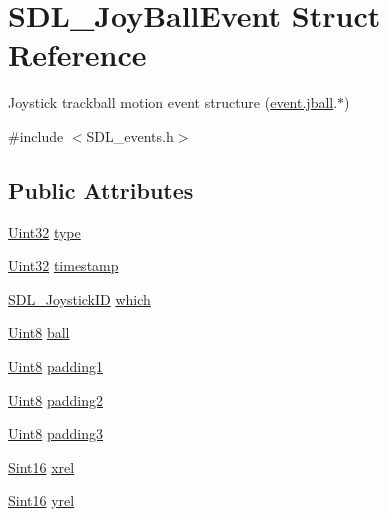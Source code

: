 \hypertarget{struct_s_d_l___joy_ball_event}{\section{S\-D\-L\-\_\-\-Joy\-Ball\-Event Struct Reference}
\label{struct_s_d_l___joy_ball_event}
}


Joystick trackball motion event structure (\hyperlink{union_s_d_l___event_ae433f511e3383d17f8fe02df745ee8f8}{event.\-jball}.$\ast$)  




{\ttfamily \#include $<$S\-D\-L\-\_\-events.\-h$>$}

\subsection*{Public Attributes}
\begin{DoxyCompactItemize}
\item 
\hyperlink{_s_d_l__stdinc_8h_add440eff171ea5f55cb00c4a9ab8672d}{Uint32} \hyperlink{struct_s_d_l___joy_ball_event_a0b192b95a043cb494b27ed9b27e84db1}{type}
\item 
\hyperlink{_s_d_l__stdinc_8h_add440eff171ea5f55cb00c4a9ab8672d}{Uint32} \hyperlink{struct_s_d_l___joy_ball_event_aa8e4fb91af62e316bb9a3219ab76148d}{timestamp}
\item 
\hyperlink{_s_d_l__joystick_8h_a3c3d32500cb08f76ee8077983912c0bd}{S\-D\-L\-\_\-\-Joystick\-I\-D} \hyperlink{struct_s_d_l___joy_ball_event_a4e2e185717d529167cd0bea21093c454}{which}
\item 
\hyperlink{_s_d_l__stdinc_8h_a2944638813a090aa23e62f4da842c3e2}{Uint8} \hyperlink{struct_s_d_l___joy_ball_event_add4eb0daeaf95ae56e8c7cfcec560242}{ball}
\item 
\hyperlink{_s_d_l__stdinc_8h_a2944638813a090aa23e62f4da842c3e2}{Uint8} \hyperlink{struct_s_d_l___joy_ball_event_aff75a6519ca2a19cffdc14ebf4626613}{padding1}
\item 
\hyperlink{_s_d_l__stdinc_8h_a2944638813a090aa23e62f4da842c3e2}{Uint8} \hyperlink{struct_s_d_l___joy_ball_event_a0ea3071b99ac096b0157714f01ff04f8}{padding2}
\item 
\hyperlink{_s_d_l__stdinc_8h_a2944638813a090aa23e62f4da842c3e2}{Uint8} \hyperlink{struct_s_d_l___joy_ball_event_acb700712f1a4070bc114ef9d55b00640}{padding3}
\item 
\hyperlink{_s_d_l__stdinc_8h_a9d0257032c0e146ab6121bf0122712f5}{Sint16} \hyperlink{struct_s_d_l___joy_ball_event_a959a8473aa1964e5e1778c27a9ffd261}{xrel}
\item 
\hyperlink{_s_d_l__stdinc_8h_a9d0257032c0e146ab6121bf0122712f5}{Sint16} \hyperlink{struct_s_d_l___joy_ball_event_a28ad48a9eb7a5d3ff62ccba09fcead76}{yrel}
\end{DoxyCompactItemize}


